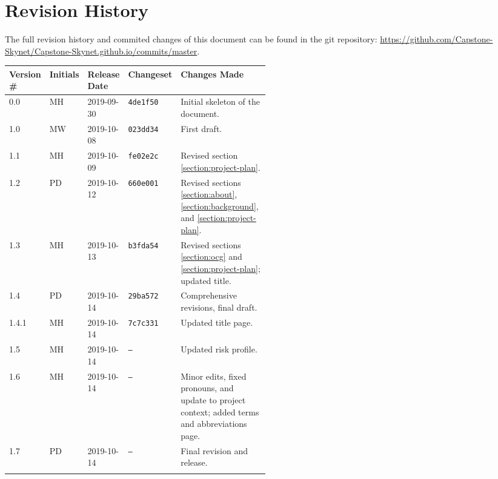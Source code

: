 \thispagestyle{empty}
\section*{Revision History}
The full revision history and commited changes of this document can be found in the git repository: \href{https://github.com/Capstone-Skynet/Capstone-Skynet.github.io}{https://github.com/Capstone-Skynet/Capstone-Skynet.github.io/commits/master}.

\begin{table}[H]
\begin{tabular}{*{4}{l}p{0.5\linewidth}}
\hline
Version \# & Initials & Release Date & Changeset & Changes Made \\ \hline

0.0 & MH & 2019-09-30 & \texttt{4de1f50} & Initial skeleton of the document.\\
1.0 & MW & 2019-10-08 & \texttt{023dd34} & First draft.\\
1.1 & MH & 2019-10-09 & \texttt{fe02e2c} & Revised section \ref{section:project-plan}.\\
1.2 & PD & 2019-10-12 & \texttt{660e001} & Revised sections \ref{section:about}, \ref{section:background}, and \ref{section:project-plan}.\\
1.3 & MH & 2019-10-13 & \texttt{b3fda54} & Revised sections \ref{section:ocg} and \ref{section:project-plan}; updated title.\\
1.4 & PD & 2019-10-14 & \texttt{29ba572} & Comprehensive revisions, final draft.\\
1.4.1 & MH & 2019-10-14 & \texttt{7c7c331} & Updated title page. \\
1.5 & MH & 2019-10-14 & \texttt{--} & Updated risk profile. \\
1.6 & MH & 2019-10-14 & \texttt{--} & Minor edits, fixed pronouns, and update to project context; added terms and abbreviations page.\\
1.7 & PD & 2019-10-14 & \texttt{--} & Final revision and release.\\


 & & & \\ \hline
\end{tabular}
\end{table}